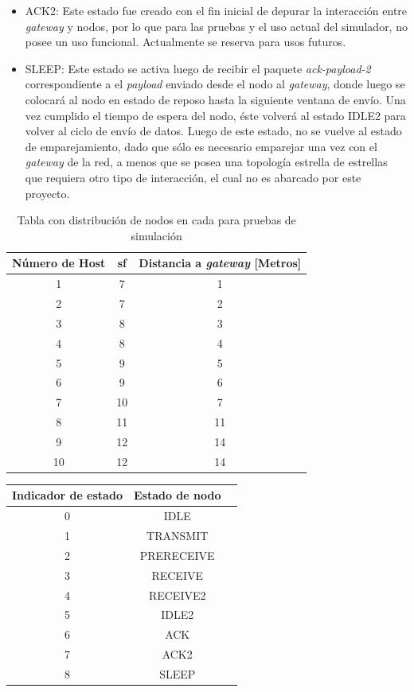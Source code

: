 \begin{justify}
\begin{itemize}
\item ACK2: Este estado fue creado con el fin inicial de depurar la interacción entre \textit{gateway} y nodos, por lo que para las pruebas y el uso actual del simulador, no posee un uso funcional. Actualmente se reserva para usos futuros.
\item SLEEP: Este estado se activa luego de recibir el paquete \textit{ack-payload-2} correspondiente a el \textit{payload} enviado desde el nodo al \textit{gateway}, donde luego se colocará al nodo en estado de reposo hasta la siguiente ventana de envío. Una vez cumplido el tiempo de espera del nodo, éste volverá al estado IDLE2 para volver al ciclo de envío de datos. Luego de este estado, no se vuelve al estado de emparejamiento, dado que sólo es necesario emparejar una vez con el \textit{gateway} de la red, a menos que se posea una topología estrella de estrellas que requiera otro tipo de interacción, el cual no es abarcado por este proyecto.
\end{itemize}

\begin{table}[!ht]
\centering
\begin{tabular}{|c|c|c|}
\hline
Número de Host & \gls{sf} & Distancia a \textit{gateway} [Metros]\\ 
\hline
1 & 7 & 1 \\
\hline
2 & 7 & 2 \\
\hline
3 & 8 & 3 \\
\hline
4 & 8 & 4 \\
\hline
5 & 9 & 5 \\
\hline
6 & 9 & 6 \\
\hline
7 & 10 & 7 \\
\hline
8 & 11 & 11 \\
\hline
9 & 12 & 14 \\
\hline
10 & 12 & 14 \\
\hline
\end{tabular}
\caption{Tabla con distribución de nodos en cada  para pruebas de simulación}
\label{tab:prueba}
\end{table}

\begin{table}[!ht]
\centering
\begin{tabular}{|c|c|c|}
\hline
Indicador de estado & Estado de nodo\\ 
\hline
0& IDLE \\
\hline
1& TRANSMIT \\
\hline
2& PRERECEIVE\\
\hline
3& RECEIVE\\
\hline
4& RECEIVE2\\
\hline
5& IDLE2\\
\hline
6& ACK\\
\hline
7& ACK2\\
\hline
8& SLEEP\\
\hline


\end{tabular}
\end{table}
\end{justify}
